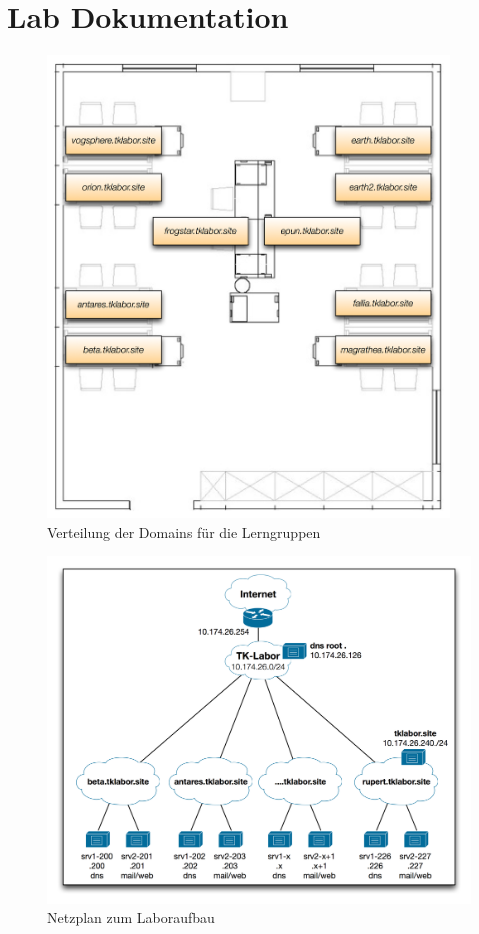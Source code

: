 \section{Lab Dokumentation}
\begin{figure}[ht]
 	\centering
 		\includegraphics[width=0.95\textwidth]{images/lab-aufbau.png}
 		\caption{Verteilung der Domains für die Lerngruppen}
 	\label{fig:chap-labdocu-aufbau}
\end{figure}

\begin{figure}[ht]
 	\centering
 		\includegraphics[width=1.0\textwidth]{images/lab-netzplan.png}
 		\caption{Netzplan zum Laboraufbau}
 	\label{fig:chap-labdocu-netzplan}
\end{figure}
